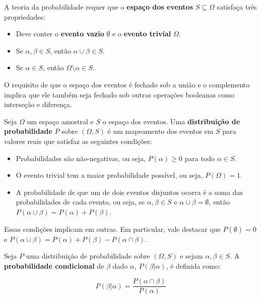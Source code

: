 A teoria da probabilidade requer que o \textbf{espaço dos eventos} $S \subseteq \Omega$ satisfaça três propriedades:

\begin{itemize}
  \item Deve conter o \textbf{evento vazio} $\emptyset$ e o \textbf{evento trivial} $\Omega$.
  \item Se $\alpha, \beta \in S$, então $\alpha \cup \beta \in S$.
  \item Se $\alpha \in S$, então $\Omega \setminus \alpha \in S$.
\end{itemize}

O requisito de que o espaço dos eventos é fechado sob a união e o complemento implica que ele também seja fechado sob outras operações booleanas como interseção e diferença.

\begin{definition}
  Seja $\Omega$ um espaço amostral e $S$ o espaço dos eventos. Uma \textbf{distribuição de probabilidade} $P$ sobre $(\Omega, S)$ é um mapeamento dos eventos em $S$ para valores reais que satisfaz as seguintes condições:

  \begin{itemize}
    \item Probabilidades são não-negativas, ou seja, $P(\alpha) \geq 0$ para todo $\alpha \in S$.
    \item O evento trivial tem a maior probabilidade possível, ou seja, $P(\Omega) = 1$.
    \item A probabilidade de que um de dois eventos disjuntos ocorra é a soma das probabilidades de cada evento, ou seja, se $\alpha, \beta \in S$ e $\alpha \cup \beta = \emptyset$, então $P(\alpha \cup \beta) = P(\alpha) + P(\beta)$.
  \end{itemize}

  Essas condições implicam em outras. Em particular, vale destacar que $P(\emptyset) = 0$ e $P(\alpha \cup \beta) = P(\alpha) + P(\beta) - P(\alpha \cap \beta)$.
\end{definition}

\begin{definition}
  Seja $P$ uma distribuição de probabilidade sobre $(\Omega, S)$ e sejam $\alpha, \beta \in S$. A \textbf{probabilidade condicional} de $\beta$ dado $\alpha$, $P(\beta | \alpha)$, é definida como:

  $$P(\beta | \alpha) = \frac{P(\alpha \cap \beta)}{P(\alpha)}$$
\end{definition}

